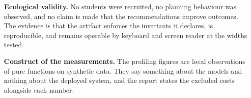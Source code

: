 \textbf{Ecological validity.} No students were recruited, no planning behaviour was observed, and
no claim is made that the recommendations improve outcomes. The evidence is that the artifact
enforces the invariants it declares, is reproducible, and remains operable by keyboard and screen
reader at the widths tested.

\textbf{Construct of the measurements.} The profiling figures are local observations of pure
functions on synthetic data. They say something about the models and nothing about the deployed
system, and the report states the excluded costs alongside each number.
